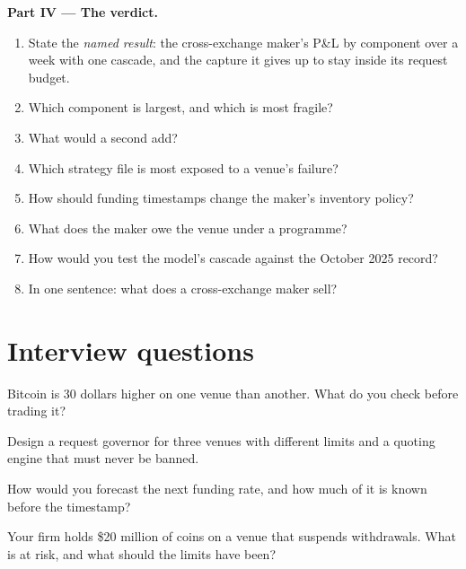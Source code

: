 \begin{problem}
\medskip\noindent\textbf{Part IV --- The verdict.}
\begin{enumerate}[resume]
\item State the \emph{named result}: the cross-exchange maker's P\&L by component over a week with one cascade, and the capture it gives up to stay
inside its request budget.
\item Which component is largest, and which is most fragile?
\item What would a second  add?
\item Which strategy file is most exposed to a venue's failure?
\item How should funding timestamps change the maker's inventory policy?
\item What does the maker owe the venue under a programme?
\item How would you test the model's cascade against the October 2025 record?
\item In one sentence: what does a cross-exchange maker sell?
\end{enumerate}
\end{problem}

\section{Interview questions}

\begin{interviewq}\label{iq:hf:crypto-high-frequency-trading-on-centralised-venues:1}
Bitcoin is 30 dollars higher on one venue than another. What do you check before trading it?
\end{interviewq}

\begin{interviewq}\label{iq:hf:crypto-high-frequency-trading-on-centralised-venues:2}
Design a request governor for three venues with different limits and a quoting engine that must never be banned.
\end{interviewq}

\begin{interviewq}\label{iq:hf:crypto-high-frequency-trading-on-centralised-venues:3}
How would you forecast the next funding rate, and how much of it is known before the timestamp?
\end{interviewq}

\begin{interviewq}\label{iq:hf:crypto-high-frequency-trading-on-centralised-venues:4}
Your firm holds \$20 million of coins on a venue that suspends withdrawals. What is at risk, and what should the limits have been?
\end{interviewq}

